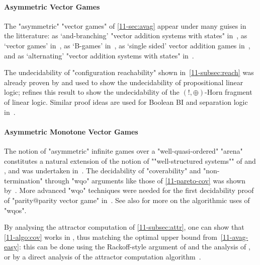 \paragraph{Asymmetric Vector Games}
The "asymmetric" "vector games" of \cref{11-sec:avag} appear
under many guises in the litterature: as `and-branching' "vector
addition systems with states"
in~\cite{Lincoln&Mitchell&Scedrov&Shankar:1992}, as `vector games'
in~\cite{Kanovich:1995}, as `B-games'
in~\cite{Raskin&Samuelides&VanBegin:2005}, as `single sided' vector
addition games in~\cite{Abdulla&al:2013}, and as `alternating'
"vector addition systems with states" in~\cite{Courtois&Schmitz:2014}.

The undecidability of "configuration reachability" shown
in~\cref{11-subsec:reach} was already proven by  and used to show the
undecidability of propositional linear logic;
 refines this result to
show the undecidability of the $(!,\oplus)$-Horn fragment of linear
logic.  Similar proof ideas are used for Boolean BI and separation
logic in~\cite{Larchey&Galmiche:2013,Brotherston&Kanovich:2014}.

\paragraph{Asymmetric Monotone Vector Games}
The notion of "asymmetric" infinite games over a "well-quasi-ordered"
"arena" constitutes a natural extension of the notion of
""well-structured systems"" of
\citet{Abdulla&Cerans&Jonsson&Tsay:2000} and
\citet{Finkel&Schnoebelen:2001}, and was undertaken
in~\cite{Abdulla&Bouajjani&dOrso:2003,Raskin&Samuelides&VanBegin:2005}.
The decidability of "coverability" and "non-termination" through "wqo"
arguments like those of \cref{11-pareto-cov} was shown
by~.  More
advanced "wqo" techniques were needed for the first decidability proof
of "parity@parity vector game" in~\cite{Abdulla&al:2013}.  See
also \cite{Schmitz&Schnoebelen:2012} for more on the algorithmic uses of
"wqos".

By analysing the attractor computation of \cref{11-subsec:attr}, one can
show that \cref{11-algo:cov} works in \kEXP[2], thus matching the
optimal upper bound from~\cref{11-avag-easy}: this can be done using
the Rackoff-style argument of \citet{Courtois&Schmitz:2014} and the
analysis of \citet{Bozzelli&Ganty:2011}, or by a direct analysis of the
attractor computation algorithm~\cite{Lazic&Schmitz:2019}.

